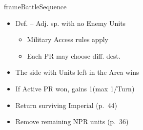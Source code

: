 \documentclass[10pt]{article}
\newlength{\fhBattleSequence} \setlength\fhBattleSequence{50\baselineskip}
\begin{document}
\begin{dynamiccontents*}{frameBattleSequence}
\begin{eubox}{\fhBattleSequence}
\begin{multicols}{2}
\begin{itemize}
\begin{itemize}
				\item Def. -- Adj. sp. with no Enemy Units
				\begin{itemize}
					\item Military Access rules apply
					\item Each PR may choose diff. dest.
				\end{itemize}
			\end{itemize}
		\end{itemize}
		\begin{itemize}
			\item The side with Units left in the Area wins
			\item If Active PR won, gains 1\milpower (max 1/Turn)
			\item Return surviving Imperial \manpower (p.~44)
			\item Remove remaining NPR units (p.~36)
		\end{itemize}
	\end{multicols}
\end{eubox}\end{dynamiccontents*}
\end{document}
